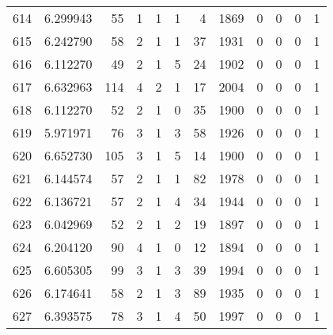 \begin{tabular}{lrrrrrrrrrrr}
614 &  6.299943 &   55 &      1 &        1 &      1 &               4 &  1869 &               0 &               0 &               0 &               1 \\
615 &  6.242790 &   58 &      2 &        1 &      1 &              37 &  1931 &               0 &               0 &               0 &               1 \\
616 &  6.112270 &   49 &      2 &        1 &      5 &              24 &  1902 &               0 &               0 &               0 &               1 \\
617 &  6.632963 &  114 &      4 &        2 &      1 &              17 &  2004 &               0 &               0 &               0 &               1 \\
618 &  6.112270 &   52 &      2 &        1 &      0 &              35 &  1900 &               0 &               0 &               0 &               1 \\
619 &  5.971971 &   76 &      3 &        1 &      3 &              58 &  1926 &               0 &               0 &               0 &               1 \\
620 &  6.652730 &  105 &      3 &        1 &      5 &              14 &  1900 &               0 &               0 &               0 &               1 \\
621 &  6.144574 &   57 &      2 &        1 &      1 &              82 &  1978 &               0 &               0 &               0 &               1 \\
622 &  6.136721 &   57 &      2 &        1 &      4 &              34 &  1944 &               0 &               0 &               0 &               1 \\
623 &  6.042969 &   52 &      2 &        1 &      2 &              19 &  1897 &               0 &               0 &               0 &               1 \\
624 &  6.204120 &   90 &      4 &        1 &      0 &              12 &  1894 &               0 &               0 &               0 &               1 \\
625 &  6.605305 &   99 &      3 &        1 &      3 &              39 &  1994 &               0 &               0 &               0 &               1 \\
626 &  6.174641 &   58 &      2 &        1 &      3 &              89 &  1935 &               0 &               0 &               0 &               1 \\
627 &  6.393575 &   78 &      3 &        1 &      4 &              50 &  1997 &               0 &               0 &               0 &               1 \\

\end{tabular}

